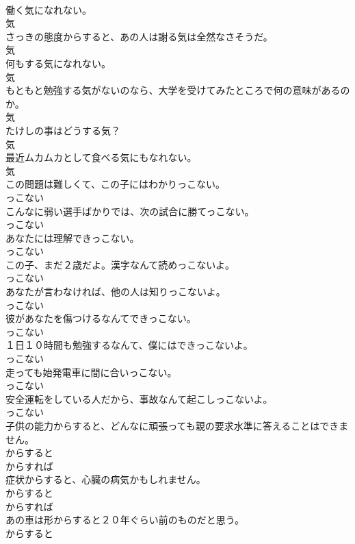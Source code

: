 \documentclass[8pt]{extreport}
\begin{document}
\begin{CJK}{UTF8}{min}
\\	働く気になれない。	
\\	気	
\\	さっきの態度からすると、あの人は謝る気は全然なさそうだ。	
\\	気	
\\	何もする気になれない。	
\\	気	
\\	もともと勉強する気がないのなら、大学を受けてみたところで何の意味があるのか。	
\\	気	
\\	たけしの事はどうする気？	
\\	気	
\\	最近ムカムカとして食べる気にもなれない。	
\\	気	
\\	この問題は難しくて、この子にはわかりっこない。	
\\	っこない	
\\	こんなに弱い選手ばかりでは、次の試合に勝てっこない。	
\\	っこない	
\\	あなたには理解できっこない。	
\\	っこない	
\\	この子、まだ２歳だよ。漢字なんて読めっこないよ。	
\\	っこない	
\\	あなたが言わなければ、他の人は知りっこないよ。	
\\	っこない	
\\	彼があなたを傷つけるなんてできっこない。	
\\	っこない	
\\	１日１０時間も勉強するなんて、僕にはできっこないよ。	
\\	っこない	
\\	走っても始発電車に間に合いっこない。	
\\	っこない	
\\	安全運転をしている人だから、事故なんて起こしっこないよ。	
\\	っこない	
\\	子供の能力からすると、どんなに頑張っても親の要求水準に答えることはできません。	
\\	からすると 
\\	からすれば	
\\	症状からすると、心臓の病気かもしれません。	
\\	からすると 
\\	からすれば	
\\	あの車は形からすると２０年ぐらい前のものだと思う。	
\\	からすると 

\end{CJK}
\end{document}
